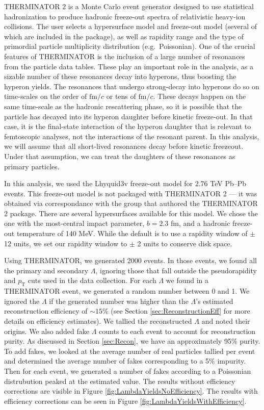 THERMINATOR 2 is a Monte Carlo event generator designed to use statistical hadronization to produce hadronic freeze-out spectra of relativistic heavy-ion collisions. 
The user selects a hypersurface model and freeze-out model (several of which are included in the package), as well as rapidity range and the type of primordial particle multiplicity distribution (e.g.\ Poissonian). 
One of the crucial features of THERMINATOR is the inclusion of a large number of resonances from the particle data tables. 
These play an important role in the analysis, as a sizable number of these resonances decay into hyperons, thus boosting the hyperon yields. 
The resonances that undergo strong-decay into hyperons do so on time-scales on the order of $\mathrm{fm}/c$ or tens of $\mathrm{fm}/c$. 
These decays happen on the same time-scale as the hadronic rescattering phase, so it is possible that the particle has decayed into its hyperon daughter before kinetic freeze-out. 
In that case, it is the final-state interaction of the hyperon daughter that is relevant to femtoscopic analyses, not the interactions of the resonant parent.  
In this analysis, we will assume that all short-lived resonances decay before kinetic freezeout. 
Under that assumption, we can treat the daughters of these resonances as primary particles. 

In this analysis, we used the Lhyquid3v freeze-out model for 2.76 TeV Pb--Pb events. This freeze-out model is not packaged with THERMINATOR 2 --- it was obtained via correspondance with the group that authored the THERMINATOR 2 package.
There are several hypersurfaces available for this model.
We chose the one with the most-central impact parameter, $b = 2.3$ fm, and a hadronic freeze-out temperature of 140 MeV.
While the default is to use a rapidity window of $\pm$ 12 units, we set our rapidity window to $\pm$ 2 units to conserve disk space.

Using THERMINATOR, we generated 2000 events. 
In those events, we found all the primary and secondary $\Lambda$, ignoring those that fall outside the pseudorapidity and $p_\mathrm{T}$ cuts used in the data collection.
For each $\Lambda$ we found in a THERMINATOR event, we generated a random number between 0 and 1. 
We ignored the $\Lambda$ if the generated number was higher than the $\Lambda$'s estimated reconstruction efficiency of $\sim15\%$ (see Section \ref{sec:ReconstructionEff} for more details on efficiency estimates). 
We tallied the reconstructed $\Lambda$ and noted their origins. 
We also added fake $\Lambda$ counts to each event to account for reconstruction purity.
As discussed in Section \ref{sec:Recon}, we have an approximately 95\% purity.
To add fakes, we looked at the average number of real particles tallied per event and determined the average number of fakes corresponding to a 5\% impurity.
Then for each event, we generated a number of fakes according to a Poissonian distrubution peaked at the estimated value.
The results without efficiency corrections are visible in Figure \ref{fig:LambdaYieldsNoEfficiency}. 
The results with efficiency corrections can be seen in Figure \ref{fig:LambdaYieldsWithEfficiency}.


